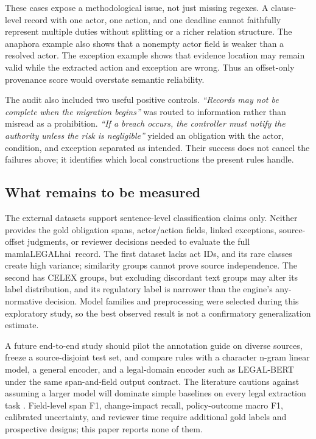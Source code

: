 \documentclass[11pt,a4paper]{article}
\newcommand{\system}{\textsf{mamlaLEGALhai}}
\begin{document}
These cases expose a methodological issue, not just missing regexes. A clause-level record with one actor, one action, and one deadline cannot faithfully represent multiple duties without splitting or a richer relation structure. The anaphora example also shows that a nonempty actor field is weaker than a resolved actor. The exception example shows that evidence location may remain valid while the extracted action and exception are wrong. Thus an offset-only provenance score would overstate semantic reliability.

The audit also included two useful positive controls. \emph{``Records may not be complete when the migration begins''} was routed to information rather than misread as a prohibition. \emph{``If a breach occurs, the controller must notify the authority unless the risk is negligible''} yielded an obligation with the actor, condition, and exception separated as intended. Their success does not cancel the failures above; it identifies which local constructions the present rules handle.

\subsection{What remains to be measured}
The external datasets support sentence-level classification claims only. Neither provides the gold obligation spans, actor/action fields, linked exceptions, source-offset judgments, or reviewer decisions needed to evaluate the full \system\ record. The first dataset lacks act IDs, and its rare classes create high variance; similarity groups cannot prove source independence. The second has CELEX groups, but excluding discordant text groups may alter its label distribution, and its regulatory label is narrower than the engine's any-normative decision. Model families and preprocessing were selected during this exploratory study, so the best observed result is not a confirmatory generalization estimate.

A future end-to-end study should pilot the annotation guide on diverse sources, freeze a source-disjoint test set, and compare rules with a character n-gram linear model, a general encoder, and a legal-domain encoder such as LEGAL-BERT \cite{legalbert} under the same span-and-field output contract. The literature cautions against assuming a larger model will dominate simple baselines on every legal extraction task \cite{piskorski2025}. Field-level span F1, change-impact recall, policy-outcome macro F1, calibrated uncertainty, and reviewer time require additional gold labels and prospective designs; this paper reports none of them.
\end{document}
